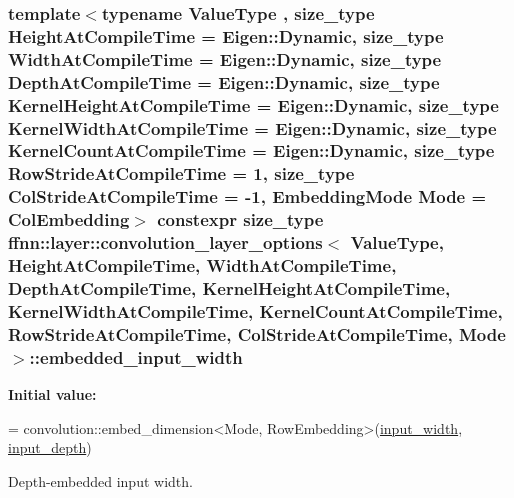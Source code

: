 \hypertarget{structffnn_1_1layer_1_1convolution__layer__options_a82638f50ec7f1028bb43c0a856c1e8ba}{
\subsubsection[{embedded\-\_\-input\-\_\-width}]{\setlength{\rightskip}{0pt plus 5cm}template$<$typename Value\-Type , size\-\_\-type Height\-At\-Compile\-Time = Eigen\-::\-Dynamic, size\-\_\-type Width\-At\-Compile\-Time = Eigen\-::\-Dynamic, size\-\_\-type Depth\-At\-Compile\-Time = Eigen\-::\-Dynamic, size\-\_\-type Kernel\-Height\-At\-Compile\-Time = Eigen\-::\-Dynamic, size\-\_\-type Kernel\-Width\-At\-Compile\-Time = Eigen\-::\-Dynamic, size\-\_\-type Kernel\-Count\-At\-Compile\-Time = Eigen\-::\-Dynamic, size\-\_\-type Row\-Stride\-At\-Compile\-Time = 1, size\-\_\-type Col\-Stride\-At\-Compile\-Time = -\/1, Embedding\-Mode Mode = Col\-Embedding$>$ constexpr {\bf size\-\_\-type} {\bf ffnn\-::layer\-::convolution\-\_\-layer\-\_\-options}$<$ Value\-Type, Height\-At\-Compile\-Time, Width\-At\-Compile\-Time, Depth\-At\-Compile\-Time, Kernel\-Height\-At\-Compile\-Time, Kernel\-Width\-At\-Compile\-Time, Kernel\-Count\-At\-Compile\-Time, Row\-Stride\-At\-Compile\-Time, Col\-Stride\-At\-Compile\-Time, Mode $>$\-::embedded\-\_\-input\-\_\-width\hspace{0.3cm}{\ttfamily [static]}}}\label{structffnn_1_1layer_1_1convolution__layer__options_a82638f50ec7f1028bb43c0a856c1e8ba}
{\bfseries Initial value\-:}
\begin{DoxyCode}
=
    convolution::embed\_dimension<Mode, RowEmbedding>(\hyperlink{structffnn_1_1layer_1_1convolution__layer__options_ad08e81ef0c9d1a0b2687a0f07d0c2104}{input\_width},  
      \hyperlink{structffnn_1_1layer_1_1convolution__layer__options_ae4d23d286d13ecb3a1127bcf34569137}{input\_depth})
\end{DoxyCode}


Depth-\/embedded input width. 

